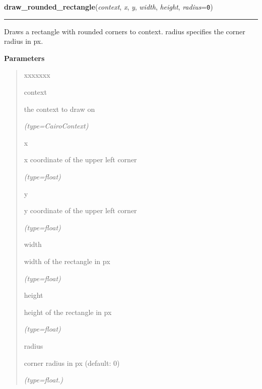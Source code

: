 \hspace{.8\funcindent}\begin{boxedminipage}{\funcwidth}

    \raggedright \textbf{draw\_rounded\_rectangle}(\textit{context}, \textit{x}, \textit{y}, \textit{width}, \textit{height}, \textit{radius}={\tt 0})

    \vspace{-1.5ex}

    \rule{\textwidth}{0.5\fboxrule}
\setlength{\parskip}{2ex}
    Draws a rectangle with rounded corners to context. radius specifies the
    corner radius in px.

\setlength{\parskip}{1ex}
      \textbf{Parameters}
      \vspace{-1ex}

      \begin{quote}
        \begin{Ventry}{xxxxxxx}

          \item[context]

          the context to draw on

            {\it (type=CairoContext)}

          \item[x]

          x coordinate of the upper left corner

            {\it (type=float)}

          \item[y]

          y coordinate of the upper left corner

            {\it (type=float)}

          \item[width]

          width of the rectangle in px

            {\it (type=float)}

          \item[height]

          height of the rectangle in px

            {\it (type=float)}

          \item[radius]

          corner radius in px (default: 0)

            {\it (type=float.)}

        \end{Ventry}

      \end{quote}

    \end{boxedminipage}


